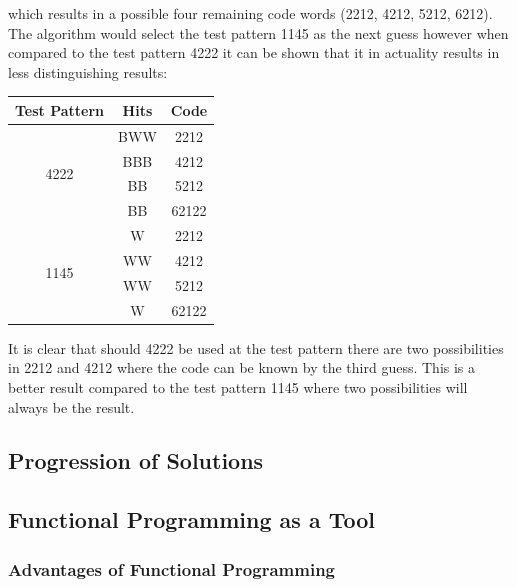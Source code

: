 \documentclass[12pt]{article}  %
\theoremstyle{definition}
\theoremstyle{remark}
\begin{document}
which results in a possible four remaining code words (2212, 4212, 5212, 6212). The algorithm would select the test pattern 1145 as the next guess however when compared to the test pattern 4222 it can be shown that it in actuality results in less distinguishing results:
\\
{
\centering
\begin{tabular}{ccc}
Test Pattern          & Hits & Code  \\ \hline
\multirow{4}{*}{4222} & BWW  & 2212  \\
                      & BBB  & 4212  \\
                      & BB   & 5212  \\
                      & BB   & 62122 \\ \hline
\multirow{4}{*}{1145} & W    & 2212  \\
                      & WW   & 4212  \\
                      & WW   & 5212  \\
                      & W    & 62122
\end{tabular} \par
} 

It is clear that should 4222 be used at the test pattern there are two possibilities in 2212 and 4212 where the code can be known by the third guess. This is a better result compared to the test pattern 1145 where two possibilities will always be the result.

\subsection {Progression of Solutions}

\subsection {Functional Programming as a Tool}

\subsubsection {Advantages of Functional Programming}
\end{document}
